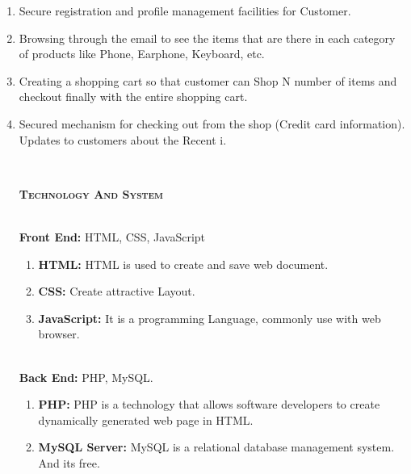 \documentclass[a4paper,titlepage,12pt]{article}
\begin{document}
\begin{enumerate}
\item Secure registration and profile management facilities for Customer.
\item Browsing through the email to see the items that are there in each category of products like Phone, Earphone, Keyboard, etc.
\item Creating a shopping cart so that customer can Shop N number of items and checkout finally with the entire shopping cart.
\item Secured mechanism for checking out from the shop (Credit card information). Updates to customers about the Recent i.

~\pagebreak
\begin{center}
{\LARGE \color{airforceblue}\textsc{\textbf{Technology And System}}}
\end{center}
~\\
\textbf{Front End:} HTML, CSS, JavaScript

\begin{enumerate}
\item \textbf{HTML:} HTML is used to create and save web document.
\item \textbf{CSS:} Create attractive Layout.
\item \textbf{JavaScript:} It is a programming Language, commonly use with web browser.
\end{enumerate}




~\\
\textbf{Back End:} PHP, MySQL.

\begin{enumerate}
\item \textbf{PHP:} PHP is a technology  that allows software developers to create dynamically generated web page in HTML.
\item \textbf{MySQL Server:} MySQL is a relational database management system. And its free.
\end{enumerate}

~\\
\end{enumerate}
\end{document}
